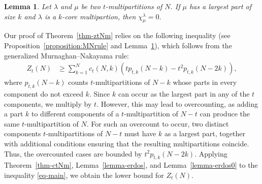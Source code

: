 \documentclass[11pt]{amsart}
\theoremstyle{plain}
\newtheorem{lemma}[theorem]{Lemma}
\numberwithin{equation}{section}
\begin{document}
	
	
	\begin{lemma}\label{lemma-Mur}
		Let $\lambda$ and $\mu$ be two $t$-multipartitions of $N$. If $\mu$ has a largest part of size $k$ and $\lambda$ is a $k$-core multipartion, then $\chi^{\lambda}_{\mu}=0.$   
	\end{lemma}
	
	Our proof of Theorem~\ref{thm-ztNm} relies on the following inequality (see Proposition~\ref{proposition:MNrule} and Lemma~\ref{lemma-Mur}), which follows from the generalized Murnaghan--Nakayama rule:
	\begin{align}\label{eq-main}
		Z_t(N)&\ge \sum_{k=1}^{N}c_t(N,k)\left(tp_{t,k}(N-k)-t^{2}p_{t,k}(N-2k)\right),
	\end{align}
	where $p_{t,k}(N-k)$ counts $t$-multipartitions of $N-k$ whose parts in every component 
	do not exceed $k$. Since $k$ can occur as the largest part in any of the $t$ components, we multiply by $t$. However, this may lead to overcounting, as adding a part $k$ to different components of a $t$-multipartition of $N-t$ can produce the same $t$-multipartition of $N$. For such an overcount to occur, two distinct components $t$-multipartitions of $N-t$ must have $k$ as a largest part, together with additional conditions ensuring that the resulting multipartitions coincide. Thus, the overcounted cases are bounded by $t^2p_{t,k}(N-2k)$.
	Applying Theorem~\ref{thm-ctNm}, Lemma~\ref{lemma-erdos}, and Lemma~\ref{lemma-erdos0} to the inequality \eqref{eq-main}, we obtain the lower bound for $Z_t(N)$.
	
\end{document}
